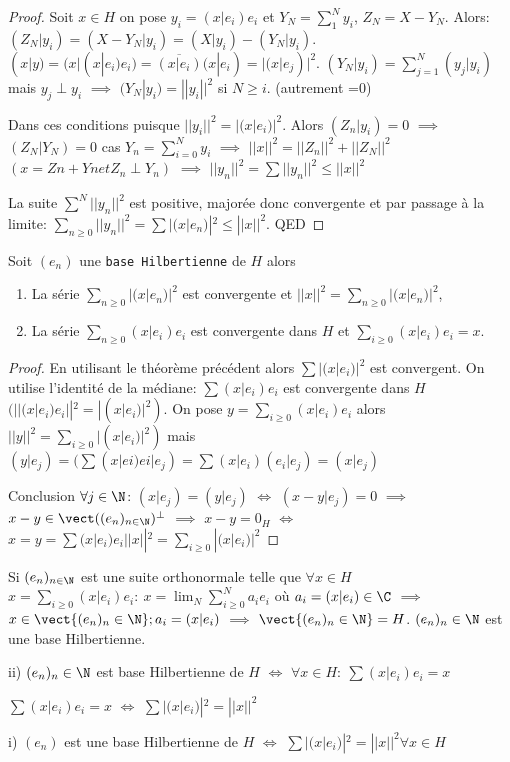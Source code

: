 \begin{proof}
	Soit $x\in H$ on pose $y_i=(x|e_i)e_i$ et $Y_N=∑_1^Ny_i$, $Z_N=X-Y_N$. Alors: $(Z_N|y_i)=(X-Y_N|y_i)=(X|y_i)-(Y_N|y_i)$. $(x|y)=(x|(x|e_i)e_i)=\overline{(x|e_i)}(x|e_i)=|(x|e_j)|^2$. $(Y_N|y_i)=∑_{j=1}^N(y_j|y_i)$ mais $y_j\perp y_i$ $\implies$  $(Y_N|y_i) =||y_i||^2$ si $N≥i$.
	(autrement =0)

Dans ces conditions puisque $||y_i||^2=|(x|e_i)|^2$. Alors $(Z_n|y_i)=0$ $\implies$  $(Z_N|Y_N)=0$ cas $Y_n=∑_{i=0}^Ny_i$ $\implies$  $||x||^2=||Z_n||^2+||Z_N||^2$ $(x=Zn+Yn et Z_n\perp Y_n)$
$\implies$  $||y_n||^2=∑||y_n||^2≤||x||^2$


La suite $∑^N||y_n||^2$ est positive, majorée donc convergente et par passage à la limite: $∑_{n≥0}||y_n||^2=∑|(x|e_n)|^2≤||x||^2$. QED
\end{proof}

\begin{theorem}
	Soit $(e_n)$ une \texttt{base Hilbertienne} de $H$ alors 
	\begin{enumerate}
		\item La série $∑_{n≥0}|(x|e_n)|^2$ est convergente et $||x||^2=∑_{n≥0}|(x|e_n)|^2$,
		\item La série $∑_{n≥0}(x|e_i)e_i$ est convergente dans $H$ et $∑_{i≥0}(x|e_i)e_i=x$.
	\end{enumerate}
\end{theorem}
\begin{proof}
	En utilisant le théorème précédent alors $∑|(x|e_i)|^2$ est convergent. On utilise l'identité de la médiane: $∑(x|e_i)e_i$ est convergente dans $H$ $(||(x|e_i)e_i||^2 =|(x|e_i)|^2)$.
	On pose $y=∑_{i≥0}(x|e_i)e_i$ alors $||y||^2 =∑_{i≥0}|(x|e_i)|^2)$ mais $(y|e_j)=(∑(x|ei)ei|e_j)=∑(x|e_i)(e_i|e_j)=(x|e_j)$
	
	Conclusion $\forall j\in \N$: $(x|e_j)=(y|e_j)$ $\iff$
	$ (x-y|e_j)=0$ $\implies$  $x-y\in\vect((e_n)_{n\in\N})^\perp$
	$\implies$  $x-y=0_H$ $\iff$ $x=y=∑(x|e_i) e_i ||x||^2=∑_{i≥0}|(x|e_i)|^2$
\end{proof}
\begin{remark}
	Si $(e_n)_{n\in \N}$ est une suite orthonormale telle que $\forall x\in H$ $x=∑_{i≥0}(x|e_i)e_i:\ x=\lim_N ∑_{i≥0}^N a_ie_i$ où $a_i=(x|e_i)\in\C$ $\implies$
	$x \in \vect\{(e_n)_n\in \N\}; a_i=(x|e_i)$ $\implies$  $\vect\{(e_n)_n\in\N\}=H$. $(e_n)_n\in \N$ est une base Hilbertienne.
	
	ii) $(e_n)_n\in\N$ est base Hilbertienne de $H$ $\iff$ $\forall x\in H:\ ∑(x|e_i)e_i=x $
	
	$∑(x|e_i)e_i=x$ $\iff$ $∑|(x|e_i)|^2=||x||^2 $ 
	
	i) $(e_n)$ est une base Hilbertienne de $H$ $\iff$ $∑|(x|e_i)|^2=||x||^2 \forall x\in H$
\end{remark}


